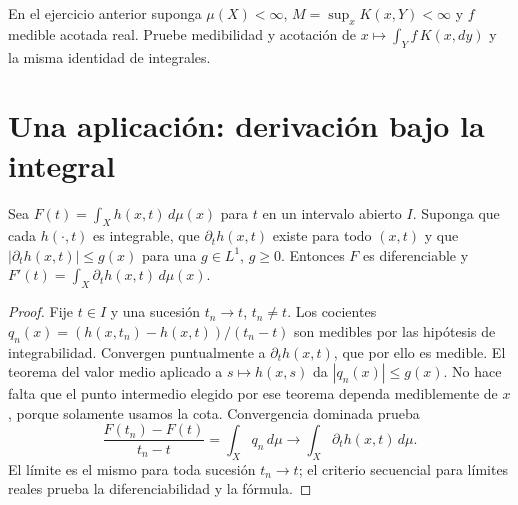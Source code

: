 \begin{ejercicio}\label{ej:v2-l10-9}
En el ejercicio anterior suponga $\mu(X)<\infty$, $M=\sup_xK(x,Y)<\infty$ y $f$ medible acotada real. Pruebe medibilidad y acotación de $x\mapsto\int_Yf\,K(x,dy)$ y la misma identidad de integrales.
\end{ejercicio}


\section{Una aplicación: derivación bajo la integral}
\begin{teorema}\label{teo:v2-derivar-integral}
Sea $F(t)=\int_Xh(x,t)\,d\mu(x)$ para $t$ en un intervalo abierto $I$. Suponga que cada $h(\cdot,t)$ es integrable, que $\partial_th(x,t)$ existe para todo $(x,t)$ y que $|\partial_th(x,t)|\le g(x)$ para una $g\in L^1$, $g\ge0$. Entonces $F$ es diferenciable y $F'(t)=\int_X\partial_th(x,t)\,d\mu(x)$.
\end{teorema}
\begin{proof}
Fije $t\in I$ y una sucesión $t_n\to t$, $t_n\ne t$. Los cocientes $q_n(x)=(h(x,t_n)-h(x,t))/(t_n-t)$ son medibles por las hipótesis de integrabilidad. Convergen puntualmente a $\partial_th(x,t)$, que por ello es medible. El teorema del valor medio aplicado a $s\mapsto h(x,s)$ da $|q_n(x)|\le g(x)$. No hace falta que el punto intermedio elegido por ese teorema dependa mediblemente de $x$, porque solamente usamos la cota. Convergencia dominada prueba
\[\frac{F(t_n)-F(t)}{t_n-t}=\int_Xq_n\,d\mu\longrightarrow\int_X\partial_th(x,t)\,d\mu.\]
El límite es el mismo para toda sucesión $t_n\to t$; el criterio secuencial para límites reales prueba la diferenciabilidad y la fórmula.
\end{proof}
